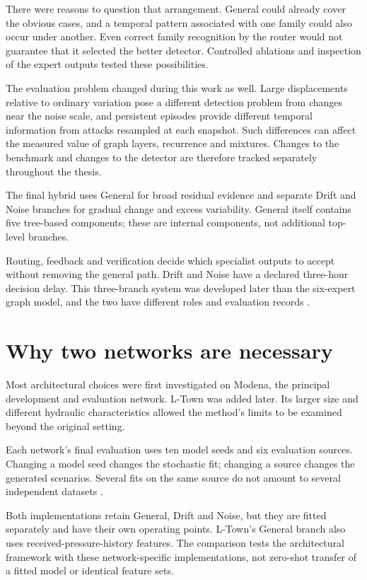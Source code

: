 There were reasons to question that arrangement. General could already cover the obvious cases, and a temporal pattern associated with one family could also occur under another. Even correct family recognition by the router would not guarantee that it selected the better detector. Controlled ablations and inspection of the expert outputs tested these possibilities.

The evaluation problem changed during this work as well. Large displacements relative to ordinary variation pose a different detection problem from changes near the noise scale, and persistent episodes provide different temporal information from attacks resampled at each snapshot. Such differences can affect the measured value of graph layers, recurrence and mixtures. Changes to the benchmark and changes to the detector are therefore tracked separately throughout the thesis.

The final hybrid uses General for broad residual evidence and separate Drift and Noise branches for gradual change and excess variability. General itself contains five tree-based components; these are internal components, not additional top-level branches.

Routing, feedback and verification decide which specialist outputs to accept without removing the general path. Drift and Noise have a declared three-hour decision delay. This three-branch system was developed later than the six-expert graph model, and the two have different roles and evaluation records \cite{projectcampaign}.

\section{Why two networks are necessary}
Most architectural choices were first investigated on Modena, the principal development and evaluation network. L-Town was added later. Its larger size and different hydraulic characteristics allowed the method's limits to be examined beyond the original setting.

Each network's final evaluation uses ten model seeds and six evaluation sources. Changing a model seed changes the stochastic fit; changing a source changes the generated scenarios. Several fits on the same source do not amount to several independent datasets \cite{projectfinal}.

Both implementations retain General, Drift and Noise, but they are fitted separately and have their own operating points. L-Town's General branch also uses received-pressure-history features. The comparison tests the architectural framework with these network-specific implementations, not zero-shot transfer of a fitted model or identical feature sets.

